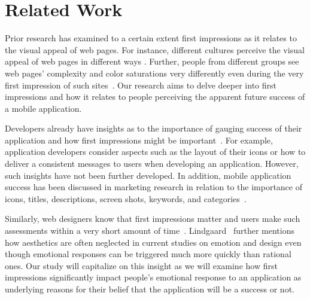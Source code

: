 \section{Related Work}



Prior research has examined to a certain extent first impressions as it relates to the visual appeal of web pages. For instance, different cultures perceive the visual appeal of web pages in different ways \cite{Reinecke:2013:PUF:2470654.2481281}. Further, people from different groups see web pages' complexity and color saturations very differently even during the very first impression of such sites~\cite{Reinecke:2013:PUF:2470654.2481281}. Our research aims to delve deeper into first impressions and how it relates to people perceiving the apparent future success of a mobile application.

Developers already have insights as to the importance of gauging success of their application and how first impressions might be important~\cite{wooldridge2010the}. For example, application developers consider aspects such as the layout of their icons or how to deliver a consistent messages to users when developing an application. However, such insights have not been further developed. In addition, mobile application success has been discussed in marketing research in relation to the importance of icons, titles, descriptions, screen shots, keywords, and categories~\cite{mureta12:app}.

Similarly, web designers know that first impressions matter and users make such assessments within a very short amount of time~\cite{needsource-attentionwebdesigners}. Lindgaard~\cite{needsource-attentionwebdesigners} further mentions how aesthetics are often neglected in current studies on emotion and design even though emotional responses can be triggered much more quickly than rational ones. Our study will capitalize on this insight as we will examine how first impressions  significantly impact people's emotional response to an application as underlying reasons for their belief that the application will be a success or not.
